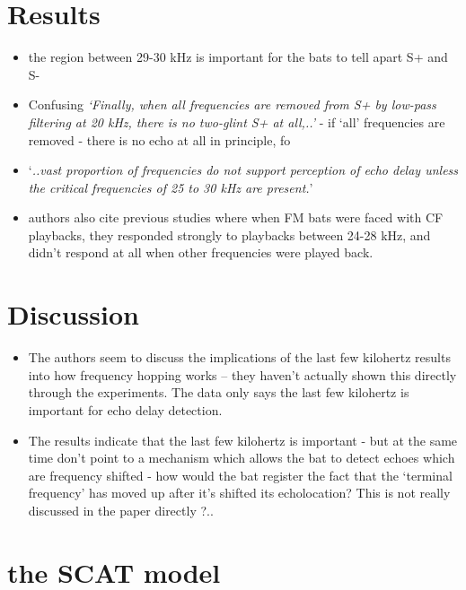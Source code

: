 \documentclass[
]{book}
\providecommand{\tightlist}{%
  \setlength{\itemsep}{0pt}\setlength{\parskip}{0pt}}
\begin{document}
\hypertarget{results-9}{%
\section{Results}\label{results-9}}

\begin{itemize}
\tightlist
\item
  the region between 29-30 kHz is important for the bats to tell apart S+ and S-
\item
  Confusing \emph{`Finally, when all frequencies are removed from S+ by low-pass filtering at 20 kHz, there is no two-glint S+ at all,..'} - if `all' frequencies are removed - there is no echo at all in principle, fo
\item
  `\emph{..vast proportion of frequencies do not support perception of echo delay unless the critical frequencies of 25 to 30 kHz are present.}'
\item
  authors also cite previous studies where when FM bats were faced with CF playbacks, they responded strongly to playbacks between 24-28 kHz, and didn't respond at all when other frequencies were played back.
\end{itemize}

\hypertarget{discussion-4}{%
\section{Discussion}\label{discussion-4}}

\begin{itemize}
\tightlist
\item
  The authors seem to discuss the implications of the last few kilohertz results into how frequency hopping works -- they haven't actually shown this directly through the experiments. The data only says the last few kilohertz is important for echo delay detection.
\item
  The results indicate that the last few kilohertz is important - but at the same time don't point to a mechanism which allows the bat to detect echoes which are frequency shifted - how would the bat register the fact that the `terminal frequency' has moved up after it's shifted its echolocation? This is not really discussed in the paper directly ?..
\end{itemize}

\hypertarget{the-scat-model}{%
\section{the SCAT model}\label{the-scat-model}}
\end{document}
